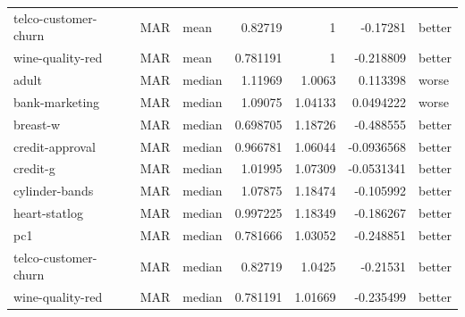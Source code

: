 \begin{table}[ht]
\begin{tabular}{lllrrrl}
 telco-customer-churn & MAR         & mean             &                                 0.82719  &                             1        &                    -0.17281    & better               \\
 wine-quality-red     & MAR         & mean             &                                 0.781191 &                             1        &                    -0.218809   & better               \\
 adult                & MAR         & median           &                                 1.11969  &                             1.0063   &                     0.113398   & worse                \\
 bank-marketing       & MAR         & median           &                                 1.09075  &                             1.04133  &                     0.0494222  & worse                \\
 breast-w             & MAR         & median           &                                 0.698705 &                             1.18726  &                    -0.488555   & better               \\
 credit-approval      & MAR         & median           &                                 0.966781 &                             1.06044  &                    -0.0936568  & better               \\
 credit-g             & MAR         & median           &                                 1.01995  &                             1.07309  &                    -0.0531341  & better               \\
 cylinder-bands       & MAR         & median           &                                 1.07875  &                             1.18474  &                    -0.105992   & better               \\
 heart-statlog        & MAR         & median           &                                 0.997225 &                             1.18349  &                    -0.186267   & better               \\
 pc1                  & MAR         & median           &                                 0.781666 &                             1.03052  &                    -0.248851   & better               \\
 telco-customer-churn & MAR         & median           &                                 0.82719  &                             1.0425   &                    -0.21531    & better               \\
 wine-quality-red     & MAR         & median           &                                 0.781191 &                             1.01669  &                    -0.235499   & better               \\

\end{tabular}
\end{table}
